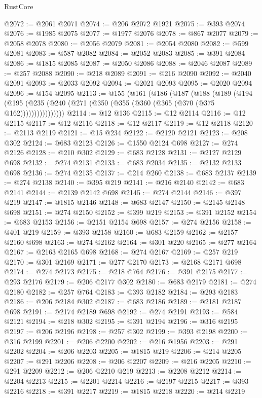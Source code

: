 \begin{lexlean}{RustCore}
\begin{coremodule}
@2072 := @2061 @2071
@2074 := @206 @2072 @1921
@2075 := @393 @2074
@2076 := @1985 @2075
@2077 := @1977 @2076
@2078 := @867 @2077
@2079 := @2058 @2078
@2080 := @2056 @2079
@2081 := @2054 @2080
@2082 := @599 @2081
@2083 := @587 @2082
@2084 := @2052 @2083
@2085 := @391 @2084
@2086 := @1815 @2085
@2087 := @2050 @2086
@2088 := @2046 @2087
@2089 := @257 @2088
@2090 := @218 @2089
@2091 := @216 @2090
@2092 := @2040 @2091
@2093 := @2033 @2092
@2094 := @2021 @2093
@2095 := @2020 @2094
@2096 := @154 @2095
@2113 := @155
    (@161
      (@186
        (@187
          (@188
            (@189
              (@194 (@195 (@235 (@240 (@271 (@350 (@355 (@360 (@365 (@370 (@375 @162))))))))))))))))
@2114 := @12 @136
@2115 := @12 @2114
@2116 := @12 @2115
@2117 := @12 @2116
@2118 := @12 @2117
@2119 := @12 @2118
@2120 := @2113 @2119
@2121 := @15 @234
@2122 := @2120 @2121
@2123 := @208 @302
@2124 := @683 @2123
@2126 := @1550 @2124 @698
@2127 := @274 @2126
@2128 := @210 @302
@2129 := @683 @2128
@2131 := @2127 @2129 @698
@2132 := @274 @2131
@2133 := @683 @2034
@2135 := @2132 @2133 @698
@2136 := @274 @2135
@2137 := @214 @260
@2138 := @683 @2137
@2139 := @274 @2138
@2140 := @395 @219
@2141 := @216 @2140
@2142 := @683 @2141
@2144 := @2139 @2142 @698
@2145 := @274 @2144
@2146 := @397 @219
@2147 := @1815 @2146
@2148 := @683 @2147
@2150 := @2145 @2148 @698
@2151 := @274 @2150
@2152 := @399 @219
@2153 := @391 @2152
@2154 := @683 @2153
@2156 := @2151 @2154 @698
@2157 := @274 @2156
@2158 := @401 @219
@2159 := @393 @2158
@2160 := @683 @2159
@2162 := @2157 @2160 @698
@2163 := @274 @2162
@2164 := @301 @220
@2165 := @277 @2164
@2167 := @2163 @2165 @698
@2168 := @274 @2167
@2169 := @257 @219
@2170 := @301 @2169
@2171 := @277 @2170
@2173 := @2168 @2171 @698
@2174 := @274 @2173
@2175 := @218 @764
@2176 := @391 @2175
@2177 := @293 @2176
@2179 := @206 @2177 @302
@2180 := @683 @2179
@2181 := @274 @2180
@2182 := @257 @764
@2183 := @393 @2182
@2184 := @293 @2183
@2186 := @206 @2184 @302
@2187 := @683 @2186
@2189 := @2181 @2187 @698
@2191 := @2174 @2189 @698
@2192 := @274 @2191
@2193 := @584 @2121
@2194 := @218 @302
@2195 := @391 @2194
@2196 := @316 @2195
@2197 := @206 @2196
@2198 := @257 @302
@2199 := @393 @2198
@2200 := @316 @2199
@2201 := @206 @2200
@2202 := @216 @1956
@2203 := @291 @2202
@2204 := @206 @2203
@2205 := @1815 @219
@2206 := @214 @2205
@2207 := @291 @2206
@2208 := @206 @2207
@2209 := @216 @2205
@2210 := @291 @2209
@2212 := @206 @2210 @219
@2213 := @2208 @2212
@2214 := @2204 @2213
@2215 := @2201 @2214
@2216 := @2197 @2215
@2217 := @393 @2216
@2218 := @391 @2217
@2219 := @1815 @2218
@2220 := @214 @2219

\end{coremodule}
\end{lexlean}
